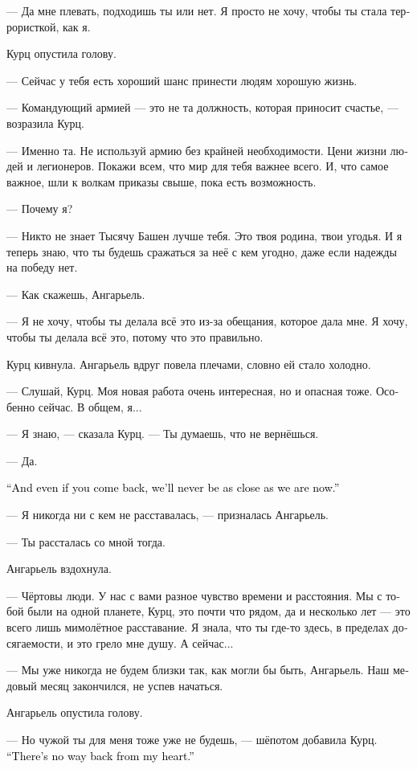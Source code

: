 \documentclass[a4paper,12pt,fleqn]{book}\usepackage{cooltooltips}\usepackage{polyglossia}\setdefaultlanguage[babelshorthands=true]{russian}\setotherlanguage{english}\defaultfontfeatures{Ligatures=TeX,Mapping=tex-text} \usepackage{xcolor}\definecolor{lightgray}{HTML}{bbbbbb}\color{lightgray}\newcommand{\ml}[3]{\textenglish{\textcolor{black}{#3}}}
\begin{document}
--- Да мне плевать, подходишь ты или нет.
Я просто не хочу, чтобы ты стала террористкой, как я.

Курц опустила голову.

--- Сейчас у тебя есть хороший шанс принести людям хорошую жизнь.

--- Командующий армией --- это не та должность, которая приносит счастье, --- возразила Курц.

--- Именно та.
Не используй армию без крайней необходимости.
Цени жизни людей и легионеров.
Покажи всем, что мир для тебя важнее всего.
И, что самое важное, шли к волкам приказы свыше, пока есть возможность.

--- Почему я?

--- Никто не знает Тысячу Башен лучше тебя.
Это твоя родина, твои угодья.
И я теперь знаю, что ты будешь сражаться за неё с кем угодно, даже если надежды на победу нет.

--- Как скажешь, Ангарьель.

--- Я не хочу, чтобы ты делала всё это из-за обещания, которое дала мне.
Я хочу, чтобы ты делала всё это, потому что это правильно.

Курц кивнула.
Ангарьель вдруг повела плечами, словно ей стало холодно.

--- Слушай, Курц.
Моя новая работа очень интересная, но и опасная тоже.
Особенно сейчас.
В общем, я...

--- Я знаю, --- сказала Курц.
--- Ты думаешь, что не вернёшься.

--- Да.

\ml{$0$}
{--- А если вернёшься, мы никогда не будем так близки.}
{``And even if you come back, we'll never be as close as we are now.''}

--- Я никогда ни с кем не расставалась, --- призналась Ангарьель.

--- Ты рассталась со мной тогда.

Ангарьель вздохнула.

--- Чёртовы люди.
У нас с вами разное чувство времени и расстояния.
Мы с тобой были на одной планете, Курц, это почти что рядом, да и несколько лет --- это всего лишь мимолётное расставание.
Я знала, что ты где-то здесь, в пределах досягаемости, и это грело мне душу.
А сейчас...

--- Мы уже никогда не будем близки так, как могли бы быть, Ангарьель.
Наш медовый месяц закончился, не успев начаться.

Ангарьель опустила голову.

--- Но чужой ты для меня тоже уже не будешь, --- шёпотом добавила Курц.
\ml{$0$}
{--- Из моего сердца обратной дороги нет.}
{``There's no way back from my heart.''}
\end{document}
